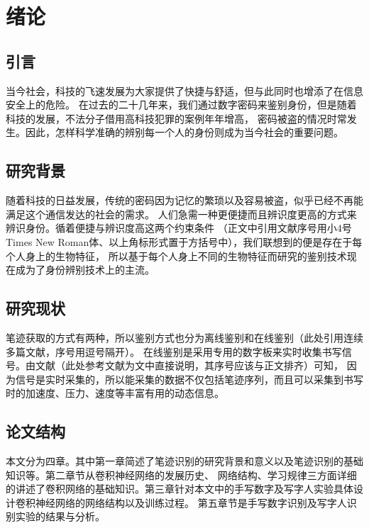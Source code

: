 
\section{绪论}

\subsection{引言}
当今社会，科技的飞速发展为大家提供了快捷与舒适，但与此同时也增添了在信息安全上的危险。
在过去的二十几年来，我们通过数字密码来鉴别身份，但是随着科技的发展，不法分子借用高科技犯罪的案例年年增高，
密码被盗的情况时常发生。因此，怎样科学准确的辨别每一个人的身份则成为当今社会的重要问题。

\subsection{研究背景}
随着科技的日益发展，传统的密码因为记忆的繁琐以及容易被盗，似乎已经不再能满足这个通信发达的社会的需求。
人们急需一种更便捷而且辨识度更高的方式来辨识身份。循着便捷与辨识度高这两个约束条件\supercite{lecun1998gradient}
（正文中引用文献序号用小4号Times New Roman体、以上角标形式置于方括号中），我们联想到的便是存在于每个人身上的生物特征，
所以基于每个人身上不同的生物特征而研究的鉴别技术现在成为了身份辨别技术上的主流。

\subsection{研究现状}
笔迹获取的方式有两种，所以鉴别方式也分为离线鉴别和在线鉴别\supercite{krizhevsky2012imagenet, ngiam2010tiled}（此处引用连续多篇文献，序号用逗号隔开）。
在线鉴别是采用专用的数字板来实时收集书写信号。由文献（此处参考文献为文中直接说明，其序号应该与正文排齐）可知，
因为信号是实时采集的，所以能采集的数据不仅包括笔迹序列，而且可以采集到书写时的加速度、压力、速度等丰富有用的动态信息。

\subsection{论文结构}
本文分为四章。其中第一章简述了笔迹识别的研究背景和意义以及笔迹识别的基础知识等。第二章节从卷积神经网络的发展历史、
网络结构、学习规律三方面详细的讲述了卷积网络的基础知识。第三章针对本文中的手写数字及写字人实验具体设计卷积神经网络的网络结构以及训练过程。
第五章节是手写数字识别及写字人识别实验的结果与分析。

\newpage
